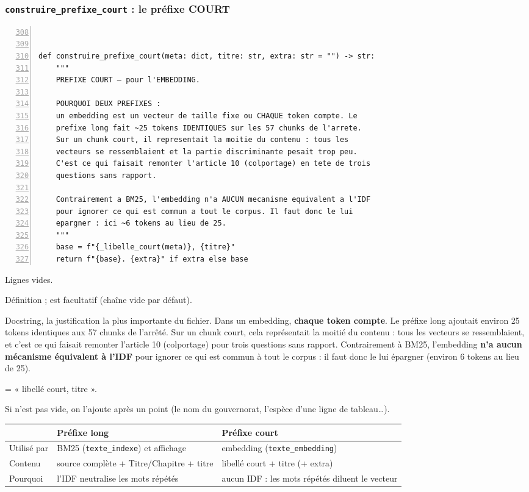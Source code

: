 \documentclass[11pt,a4paper]{article}
\newcommand{\ligne}[1]{\item[\textcolor{num}{L.\,#1}]}
\newenvironment{explication}
  {\begin{description}\setlength{\itemsep}{3pt}\setlength{\parskip}{2pt}}
  {\end{description}}
\begin{document}
\subsubsection*{\texttt{construire\_prefixe\_court} : le préfixe COURT}
\begin{shaded}
\begin{Verbatim}[numbers=left,firstnumber=308,numbersep=6pt,fontsize=\footnotesize,xleftmargin=1.2em]


def construire_prefixe_court(meta: dict, titre: str, extra: str = "") -> str:
    """
    PREFIXE COURT — pour l'EMBEDDING.

    POURQUOI DEUX PREFIXES :
    un embedding est un vecteur de taille fixe ou CHAQUE token compte. Le
    prefixe long fait ~25 tokens IDENTIQUES sur les 57 chunks de l'arrete.
    Sur un chunk court, il representait la moitie du contenu : tous les
    vecteurs se ressemblaient et la partie discriminante pesait trop peu.
    C'est ce qui faisait remonter l'article 10 (colportage) en tete de trois
    questions sans rapport.

    Contrairement a BM25, l'embedding n'a AUCUN mecanisme equivalent a l'IDF
    pour ignorer ce qui est commun a tout le corpus. Il faut donc le lui
    epargner : ici ~6 tokens au lieu de 25.
    """
    base = f"{_libelle_court(meta)}, {titre}"
    return f"{base}. {extra}" if extra else base
\end{Verbatim}
\end{shaded}

\begin{explication}
\ligne{308--309} Lignes vides.
\ligne{310} Définition ; \Verb@extra@ est facultatif (chaîne vide par défaut).
\ligne{311--325} Docstring, la justification la plus importante du fichier. Dans un embedding,
\textbf{chaque token compte}. Le préfixe long ajoutait environ 25 tokens identiques aux 57
chunks de l'arrêté. Sur un chunk court, cela représentait la moitié du contenu : tous les
vecteurs se ressemblaient, et c'est ce qui faisait remonter l'article 10 (colportage) pour
trois questions sans rapport. Contrairement à BM25, l'embedding \textbf{n'a aucun mécanisme
équivalent à l'IDF} pour ignorer ce qui est commun à tout le corpus : il faut donc le lui
épargner (environ 6 tokens au lieu de 25).
\ligne{326} \Verb@base@ = « libellé court, titre ».
\ligne{327} Si \Verb@extra@ n'est pas vide, on l'ajoute après un point (le nom du gouvernorat,
l'espèce d'une ligne de tableau…).
\end{explication}

\begin{longtable}{p{3cm} p{6cm} p{6cm}}
\toprule
 & \textbf{Préfixe long} & \textbf{Préfixe court} \\
\midrule
Utilisé par & BM25 (\texttt{texte\_indexe}) et affichage & embedding (\texttt{texte\_embedding}) \\
Contenu & source complète + Titre/Chapitre + titre & libellé court + titre (+ extra) \\
Pourquoi & l'IDF neutralise les mots répétés & aucun IDF : les mots répétés diluent le vecteur \\
\bottomrule
\end{longtable}
\end{document}
